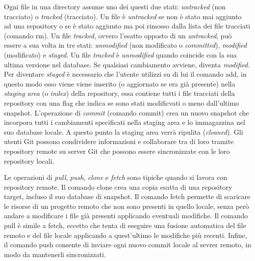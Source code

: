 Ogni file in una directory assume uno dei questi due stati:
\emph{untracked} (non tracciato) o \emph{tracked} (tracciato).
Un file è \emph{untracked} se non è stato mai aggiunto ad una repository o se è stato
aggiunto ma poi rimosso dalla lista dei file tracciati (comando \textsf{rm}).
Un file \emph{tracked}, ovvero l’esatto opposto di un \emph{untracked}, può essere a sua volta in tre
stati: \emph{unmodified} (non modificato o \emph{committed}), \emph{modified} (modificato) e \emph{staged}.
Un file \emph{tracked} è \emph{unmodified} quando coincide con la sua ultima versione nel database.
Se qualsiasi cambiamento avviene, diventa \emph{modified}.
Per diventare \emph{staged} è necessario che l’utente utilizzi su di lui il comando \textsf{add},
in questo modo esso viene viene inserito (o aggiornato se era già presente) nella \emph{staging area}
(o \emph{index}) della repository, essa contiene tutti i file tracciati della repository con una flag
che indica se sono stati modificvati o meno dall’ultimo snapshot.
L’operazione di \emph{commit} (comando \textsf{commit}) crea un nuovo snapshot che incorpora
tutti i cambiamenti specificati nella staging area e lo immagazzina nel suo database locale.
A questo punto la staging area verrà ripulita (\emph{cleaned}).
Gli utenti Git possono condividere informazioni e collaborare tra di loro tramite repository remote
su server Git che possono essere sincronizzate con le loro repository locali.

Le operazioni di \emph{pull}, \emph{push}, \emph{clone} e \emph{fetch}
sono tipiche quando si lavora con repository remote.
Il comando \textsf{clone} crea una copia esatta di una repository target,
incluso il suo database di snapshot.
Il comando \textsf{fetch} permette di scaricare le risorse di un progetto remoto che non sono
presenti in quello locale, senza però andare a modificare i file già presenti
applicando eventuali modifiche.
Il comando \textsf{pull} è simile a \textsf{fetch}, eccetto che tenta di eseguire una fusione
automatica del file remoto e del file locale applicando a quest’ultimo le modifiche più recenti.
Infine, il comando \textsf{push} consente di inviare ogni nuovo commit locale al sevrer remoto,
in modo da mantenerli sincronizzati.


